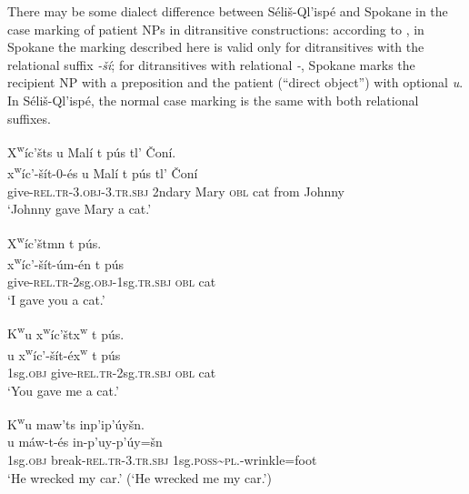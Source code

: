 \documentclass[output=paper,colorlinks,citecolor=brown]{langscibook}
\begin{document}
  There may be some dialect difference between S\'eli\v{s}-Ql'isp\'e
  and Spokane in the case marking of patient NPs in ditransitive
  constructions: according to \citet[24]{Carlson:1980}, in Spokane the
  marking described here is valid only for ditransitives with the
  relational suffix \emph{-\v{s}\'i}; for ditransitives with
  relational \emph{-{\textltilde}}, Spokane marks the recipient NP
  with a preposition and the patient (``direct object'') with
  optional \emph{{\textltilde}u}.  In S\'eli\v{s}-Ql'isp\'e, the
  normal case marking is the same with both relational suffixes.


\ea 
\label{ex-thomason-7}
X\textsuperscript w\'ic'\v{s}ts {\textltilde}u Mal\'i t p\'us tl' \v{C}on\'i. \\
\gll x\textsuperscript w\'ic'-\v{s}\'it-0-\'es {\textltilde}u Mal\'i t p\'us tl' \v{C}on\'i\\
     give-\textsc{rel.tr}-3.\textsc{obj}-3.\textsc{tr.sbj} 2ndary Mary \textsc{  obl} cat from Johnny\\
\glt `Johnny gave Mary a cat.' \\
\z

\ea X\textsuperscript w\'ic'\v{s}tmn t p\'us.  \\
\label{ex-thomason-8}
\gll x\textsuperscript w\'ic'-\v{s}\'it-\'um-\'en t p\'us\\
give-\textsc{rel.tr}-2sg.\textsc{obj}-1sg.\textsc{tr.sbj} \textsc{obl} cat\\
\glt `I gave you a cat.'
\z

\ea 
\label{ex-thomason-9}
{K\textsuperscript w}u x\textsuperscript w\'ic'\v{s}tx\textsuperscript w t  p\'us. \\
 u x\textsuperscript
w\'ic'-\v{s}\'it-\'ex\textsuperscript w t p\'us\\
1sg.\textsc{obj} give-\textsc{rel.tr}-2sg.\textsc{tr.sbj} \textsc{obl} cat \\
 \glt  `You gave me a cat.'\\
 \z

\ea 
\label{ex-thomason-10}
{K\textsuperscript w}u maw'{\textltilde}ts inp'ip'\'uy\v{s}n. \\
u m\'aw-{\textltilde}t-\'es in-p'uy-p'\'uy=\v{s}n\\
     1sg.\textsc{obj} break-\textsc{rel.tr}-3.\textsc{tr.sbj} 1sg.\textsc{poss}\textasciitilde{}\textsc{pl}.-wrinkle=foot \\
\glt `He wrecked my car.' (`He wrecked me my car.')
\z
\end{document}
